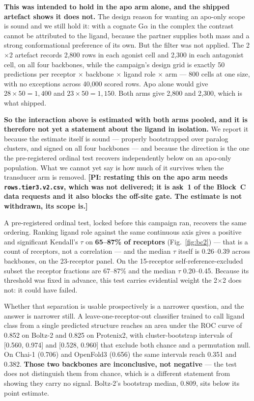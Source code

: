 \textbf{This was intended to hold in the apo arm alone, and the shipped
artefact shows it does not.} The design reason for wanting an apo-only scope is
sound and we still hold it: with a cognate G$\alpha$ in the complex the contrast
cannot be attributed to the ligand, because the partner supplies both mass and a
strong conformational preference of its own. But the filter was not applied. The
2$\times$2 artefact records 2{,}800 rows in each agonist cell and 2{,}300 in
each antagonist cell, on all four backbones, while the campaign's design grid is
exactly 50 predictions per receptor $\times$ backbone $\times$ ligand role
$\times$ arm --- 800 cells at one size, with no exceptions across 40{,}000
scored rows. Apo alone would give $28 \times 50 = 1{,}400$ and
$23 \times 50 = 1{,}150$. Both arms give 2{,}800 and 2{,}300, which is what
shipped.

\textbf{So the interaction above is estimated with both arms pooled, and it is
therefore not yet a statement about the ligand in isolation.} We report it
because the estimate itself is sound --- properly bootstrapped over paralog
clusters, and signed on all four backbones --- and because the direction is the
one the pre-registered ordinal test recovers independently below on an apo-only
population. What we cannot yet say is how much of it survives when the
transducer arm is removed. \textbf{[PI: restating this on the apo arm needs
\texttt{rows.tier3.v2.csv}, which was not delivered; it is ask~1 of the Block~C
data requests and it also blocks the off-site gate. The estimate is not
withdrawn, its scope is.]}

A pre-registered ordinal test, locked before this campaign ran, recovers the
same ordering. Ranking ligand role against the same continuous axis gives a
positive and significant Kendall's $\tau$ on \textbf{65--87\% of receptors}
(Fig.~\ref{fig:bc2}) ---
that is a count of receptors, not a correlation --- and the median $\tau$ itself
is 0.26--0.39 across backbones, on the 23-receptor panel. On the 15-receptor
self-reference-excluded subset the receptor fractions are 67--87\% and the
median $\tau$ 0.20--0.45. Because its threshold was fixed in advance, this test
carries evidential weight the 2$\times$2 does not: it could have failed.

Whether that separation is usable prospectively is a narrower question, and the
answer is narrower still. A leave-one-receptor-out classifier trained to call
ligand class from a single predicted structure reaches an area under the ROC
curve of 0.852 on Boltz-2 and 0.825 on Protenix2, with cluster-bootstrap
intervals of [0.560, 0.974] and [0.528, 0.960] that exclude both chance and a
permutation null. On Chai-1 (0.706) and OpenFold3 (0.656) the same intervals
reach 0.351 and 0.382. \textbf{Those two backbones are inconclusive, not
negative} --- the test does not distinguish them from chance, which is a
different statement from showing they carry no signal. Boltz-2's bootstrap
median, 0.809, sits below its point estimate.

